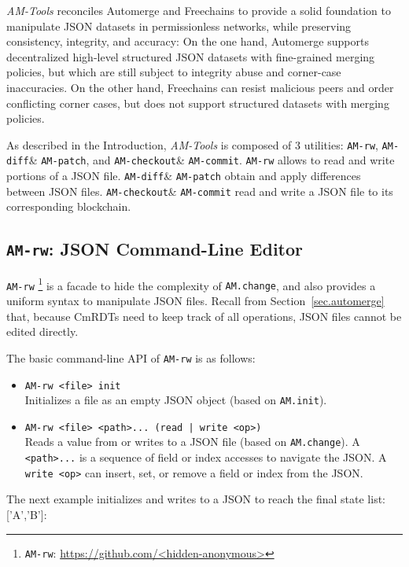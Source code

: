 \documentclass[12pt]{article}
\newcommand{\AMT}      {\emph{AM-Tools}\xspace}
\newcommand{\code}[1]  {\texttt{\footnotesize{#1}}}
\newcommand{\amrw}       {\texttt{AM-rw}\xspace}
\newcommand{\amdiff}     {\texttt{AM-diff}\xspace}
\newcommand{\ampatch}    {\texttt{AM-patch}\xspace}
\newcommand{\amcheckout} {\texttt{AM-checkout}\xspace}
\newcommand{\amcommit}   {\texttt{AM-commit}\xspace}
\begin{document}
\AMT reconciles Automerge and Freechains to provide a solid foundation to
manipulate JSON datasets in permissionless networks, while preserving
consistency, integrity, and accuracy:
%
On the one hand, Automerge supports decentralized high-level structured JSON
datasets with fine-grained merging policies, but which are still subject to
integrity abuse and corner-case inaccuracies.
%
On the other hand, Freechains can resist malicious peers and order conflicting
corner cases, but does not support structured datasets with merging policies.

As described in the Introduction, \AMT is composed of 3 utilities:
    \amrw,
    \amdiff \& \ampatch, and
    \amcheckout \& \amcommit.
%
\amrw allows to read and write portions of a JSON file.
\amdiff \& \ampatch obtain and apply differences between JSON files.
\amcheckout \& \amcommit read and write a JSON file to its corresponding
blockchain.

\subsection{\amrw: JSON Command-Line Editor}

\amrw%
    \footnote{\amrw: \url{https://github.com/<hidden-anonymous>}}
is a facade to hide the complexity of \code{AM.change}, and also provides a
uniform syntax to manipulate JSON files.
Recall from Section~\ref{sec.automerge} that, because CmRDTs need to keep
track of all operations, JSON files cannot be edited directly.

The basic command-line API of \amrw is as follows:

\begin{itemize}
\item \code{AM-rw <file> init} \\
    Initializes a file as an empty JSON object (based on \code{AM.init}).
\item \code{AM-rw <file> <path>... (read | write <op>)} \\
    Reads a value from or writes to a JSON file (based on \code{AM.change}).
    A \code{<path>...} is a sequence of field or index accesses to navigate the
    JSON.
    A \code{write <op>} can insert, set, or remove a field or index from the
    JSON.
\end{itemize}

The next example initializes and writes to a JSON to reach the final state
{list: ['A','B']}:
\end{document}

